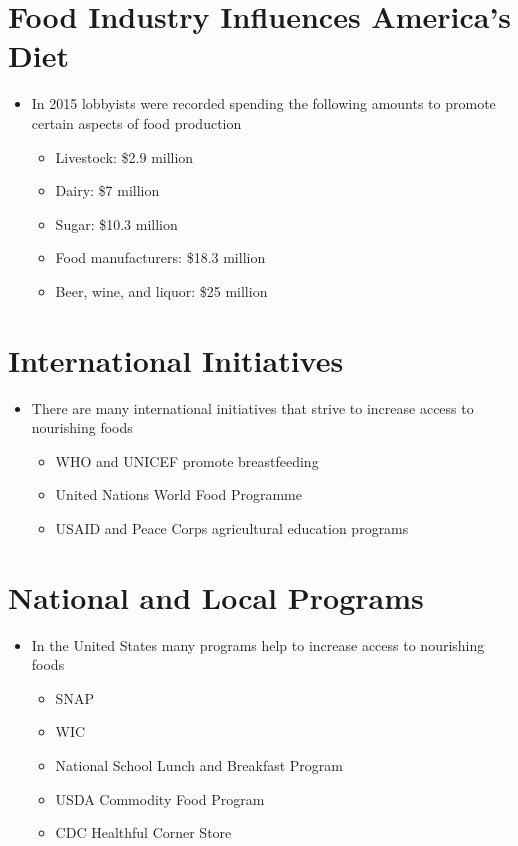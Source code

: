 \documentclass[title={Chapter 13}]{fdsn201notes}
\begin{document}
\section{Food Industry Influences America’s Diet}\label{sec:food-industry-influences-americas-diet}
\begin{itemize}
	\item In 2015 lobbyists were recorded spending the following amounts to promote certain aspects of food production
	\begin{itemize}
		\item Livestock: \$2.9 million
		\item Dairy: \$7 million
		\item Sugar: \$10.3 million
		\item Food manufacturers: \$18.3 million
		\item Beer, wine, and liquor: \$25 million
	\end{itemize}
\end{itemize}

\section{International Initiatives}\label{sec:international-initiatives}
\begin{itemize}
	\item There are many international initiatives that strive to increase access to nourishing foods
	\begin{itemize}
		\item WHO and UNICEF promote breastfeeding
		\item United Nations World Food Programme
		\item USAID and Peace Corps agricultural education programs
	\end{itemize}
\end{itemize}

\section{National and Local Programs}\label{sec:national-and-local-programs}
\begin{itemize}
	\item In the United States many programs help to increase access to nourishing foods
	\begin{itemize}
		\item SNAP
		\item WIC
		\item National School Lunch and Breakfast Program
		\item USDA Commodity Food Program
		\item CDC Healthful Corner Store
	\end{itemize}
\end{itemize}
\end{document}

